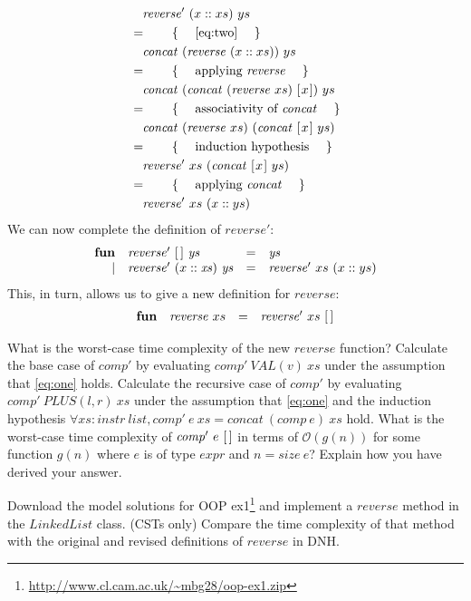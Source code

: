 \documentclass[10pt,a4paper,fleqn]{exam}
\begin{document}
\begin{questions}
\begin{parts}
\begin{align*}
\expr{\mathit{reverse}'~(x :: xs)~ys}
\hint{\autoref{eq:two}}
\expr{\mathit{concat}~(\mathit{reverse}~(x :: xs))~ys}
\hint{applying $\mathit{reverse}$}
\expr{\mathit{concat}~(\mathit{concat}~(\mathit{reverse}~xs)~\hslist{x})~ys}
\hint{associativity of $\mathit{concat}$}
\expr{\mathit{concat}~(\mathit{reverse}~xs)~(\mathit{concat}~\hslist{x}~ys)}
\hint{induction hypothesis}
\expr{\mathit{reverse}'~xs~(\mathit{concat}~\hslist{x}~ys)}
\hint{applying $\mathit{concat}$}
\lastexpr{\mathit{reverse}'~xs~(x :: ys)}
\end{align*}
We can now complete the definition of $\mathit{reverse}'$:
\begin{displaymath}
\begin{array}{rlcl}
\mathbf{fun} & \mathit{reverse}'~\hslist{}~\mathit{ys} & = & \mathit{ys} \\
    \mid & \mathit{reverse}'~(x :: \mathit{xs})~\mathit{ys} & = & \mathit{reverse}'~xs~(x :: ys)
\end{array}
\end{displaymath}
This, in turn, allows us to give a new definition for $\mathit{reverse}$:
\begin{displaymath}
\begin{array}{rlcl}
\mathbf{fun} & \mathit{reverse}~xs & = & \mathit{reverse}'~xs~\hslist{}
\end{array}
\end{displaymath}
\begin{subparts}
\subpart[1] What is the worst-case time complexity of the new $\mathit{reverse}$ function? \droppoints 
\subpart[2] Calculate the base case of $\mathit{comp}'$ by evaluating $\mathit{comp}'~\mathit{VAL}(v)~xs$ under the assumption that \autoref{eq:one} holds. \droppoints
\subpart[5] Calculate the recursive case of $\mathit{comp}'$ by evaluating $\mathit{comp}'~\mathit{PLUS}(l,r)~xs$ under the assumption that \autoref{eq:one} and the induction hypothesis $\forall \mathit{xs} : \mathit{instr~list}, \mathit{comp'}~\mathit{e}~\mathit{xs} = \mathit{concat}~(\mathit{comp}~\mathit{e})~\mathit{xs}$ hold. \droppoints 
\subpart[2] What is the worst-case time complexity of $\mathit{comp}'~e~\hslist{}$ in terms of $\mathcal{O}(g(n))$ for some function $g(n)$ where $e$ is of type $\mathit{expr}$ and $n = \mathit{size}~e$? Explain how you have derived your answer. \droppoints 
\end{subparts}
\end{parts}
\question[2] Download the model solutions for OOP ex1\footnote{\url{http://www.cl.cam.ac.uk/~mbg28/oop-ex1.zip}} and implement a $\mathit{reverse}$ method in the $\mathit{LinkedList}$ class. \droppoints
\question[2] (CSTs only) Compare the time complexity of that method with the original and revised definitions of $\mathit{reverse}$ in DNH. \droppoints


\end{questions}
\end{document}
